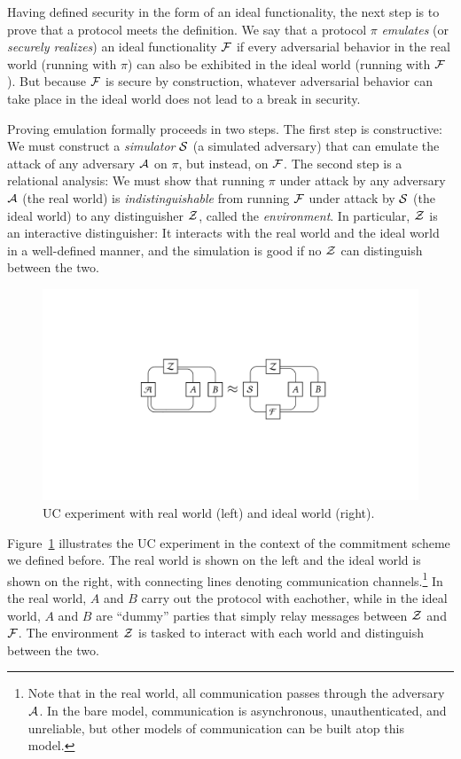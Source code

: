 Having defined security in the form of an ideal functionality, the next step is
to prove that a protocol meets the definition. We say that a protocol $\pi$
\emph{emulates} (or \emph{securely realizes}) an ideal functionality $\mathcal{{F}}$ if
every adversarial behavior in the real world (running with $\pi$) can also be
exhibited in the ideal world (running with $\mathcal{{F}}$). But because $\mathcal{{F}}$ is
secure by construction, whatever adversarial behavior can take place in the
ideal world does not lead to a break in security.

Proving emulation formally proceeds in two steps. The first step is
constructive: We must construct a \emph{simulator} $\mathcal{{S}}$ (a simulated
adversary) that can emulate the attack of any adversary $\mathcal{{A}}$ on $\pi$, but
instead, on $\mathcal{{F}}$. The second step is a relational analysis: We must show
that running $\pi$ under attack by any adversary $\mathcal{{A}}$ (the real world) is
\emph{indistinguishable} from running $\mathcal{{F}}$ under attack by $\mathcal{{S}}$ (the
ideal world) to any distinguisher $\mathcal{{Z}}$, called the \emph{environment}. In
particular, $\mathcal{{Z}}$ is an interactive distinguisher: It interacts with the real
world and the ideal world in a well-defined manner, and the simulation is good
if no $\mathcal{{Z}}$ can distinguish between the two.

\begin{figure}
  \centering
  \includegraphics[width=0.85\linewidth]{graphics/suc-experiment}
  \caption{UC experiment with real world (left) and ideal world (right).}
  \label{fig:uc-experiment}
\end{figure}

Figure~\ref{fig:uc-experiment} illustrates the UC experiment in the context of
the commitment scheme we defined before. The real world is shown on the left and
the ideal world is shown on the right, with connecting lines denoting
communication channels.\footnote{Note that in the real world, all communication
  passes through the adversary $\mathcal{{A}}$. In the bare model, communication is
  asynchronous, unauthenticated, and unreliable, but other models of
  communication can be built atop this model.} In the real world, $A$ and $B$
carry out the protocol with eachother, while in the ideal world, $A$ and $B$ are
``dummy'' parties that simply relay messages between $\mathcal{{Z}}$ and $\mathcal{{F}}$. The
environment $\mathcal{{Z}}$ is tasked to interact with each world and distinguish
between the two.

